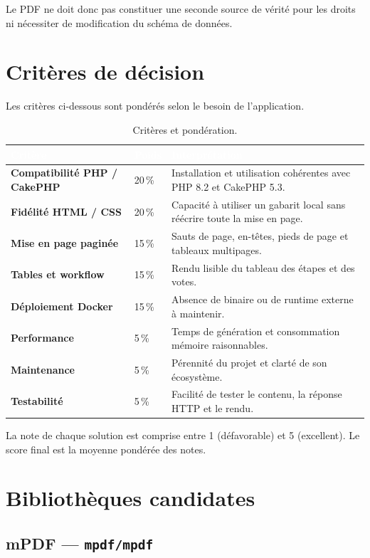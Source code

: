 \documentclass[11pt,a4paper]{article}
\begin{document}
Le PDF ne doit donc pas constituer une seconde source de vérité pour les droits
ni nécessiter de modification du schéma de données.

\section{Critères de décision}

Les critères ci-dessous sont pondérés selon le besoin de l'application.

\begin{table}[htbp]
\centering
\small
\begin{tabularx}{0.9\textwidth}{>{\bfseries}p{}Z Y}
\toprule
{}
\textcolor{white}{Critère} & \textcolor{white}{Poids} & \textcolor{white}{Interprétation} \\
\midrule
Compatibilité PHP / CakePHP & 20\,\% & Installation et utilisation cohérentes avec PHP 8.2 et CakePHP 5.3. \\
Fidélité HTML / CSS & 20\,\% & Capacité à utiliser un gabarit local sans réécrire toute la mise en page. \\
Mise en page paginée & 15\,\% & Sauts de page, en-têtes, pieds de page et tableaux multipages. \\
Tables et workflow & 15\,\% & Rendu lisible du tableau des étapes et des votes. \\
Déploiement Docker & 15\,\% & Absence de binaire ou de runtime externe à maintenir. \\
Performance & 5\,\% & Temps de génération et consommation mémoire raisonnables. \\
Maintenance & 5\,\% & Pérennité du projet et clarté de son écosystème. \\
Testabilité & 5\,\% & Facilité de tester le contenu, la réponse HTTP et le rendu. \\
\bottomrule
\end{tabularx}
\caption{Critères et pondération.}
\label{tab:criteres}
\end{table}

La note de chaque solution est comprise entre 1 (défavorable) et 5
(excellent). Le score final est la moyenne pondérée des notes.

\section{Bibliothèques candidates}

\subsection{mPDF — \texttt{mpdf/mpdf}}
\end{document}

